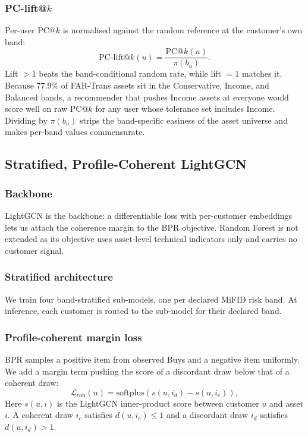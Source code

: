 \subsubsection{PC-lift@$k$}
Per-user PC@$k$ is normalised against the random reference at the customer's own band:
\begin{equation}
\text{PC-lift@}k(u) = \frac{\text{PC@}k(u)}{\pi(b_u)}.
\end{equation}
Lift $> 1$ beats the band-conditional random rate, while lift $= 1$ matches it. Because 77.9\% of FAR-Trans assets sit in the Conservative, Income, and Balanced bands, a recommender that pushes Income assets at everyone would score well on raw PC@$k$ for any user whose tolerance set includes Income. Dividing by $\pi(b_u)$ strips the band-specific easiness of the asset universe and makes per-band values commensurate.

\subsection{Stratified, Profile-Coherent LightGCN}
\label{sec:method:pclgcn}

\subsubsection{Backbone}
LightGCN is the backbone: a differentiable loss with per-customer embeddings lets us attach the coherence margin to the BPR objective. Random Forest is not extended as its objective uses asset-level technical indicators only and carries no customer signal.

\subsubsection{Stratified architecture}
We train four band-stratified sub-models, one per declared MiFID risk band. At inference, each customer is routed to the sub-model for their declared band.

\subsubsection{Profile-coherent margin loss}
BPR samples a positive item from observed Buys and a negative item uniformly. We add a margin term pushing the score of a discordant draw below that of a coherent draw:
\begin{equation}
\mathcal{L}_{\text{coh}}(u) = \text{softplus}\!\left(s(u, i_d) - s(u, i_c)\right),
\end{equation}
Here $s(u, i)$ is the LightGCN inner-product score between customer $u$ and asset $i$. A coherent draw $i_c$ satisfies $d(u, i_c) \leq 1$ and a discordant draw $i_d$ satisfies $d(u, i_d) > 1$.

